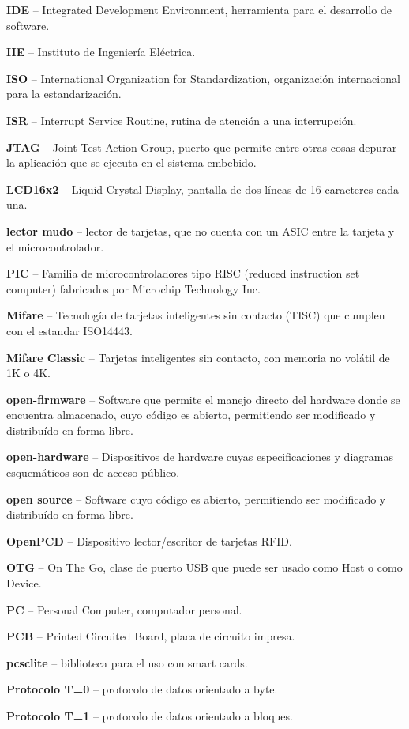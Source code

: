 \begin{glosario}
{\bf{IDE}} – Integrated Development Environment, herramienta para el desarrollo de software.

{\bf{IIE}} – Instituto de Ingeniería Eléctrica.

{\bf{ISO}} – International Organization for Standardization, organización internacional para la estandarización.

{\bf{ISR}} – Interrupt Service Routine, rutina de atención a una interrupción.

{\bf{JTAG}} – Joint Test Action Group, puerto que permite entre otras cosas depurar la aplicación que se ejecuta en el sistema embebido.

{\bf{LCD16x2}} – Liquid Crystal Display, pantalla de dos líneas de 16 caracteres cada una.

{\bf{lector mudo}} – lector de tarjetas, que no cuenta con un ASIC entre la tarjeta y el microcontrolador.

{\bf{PIC}} – Familia de microcontroladores tipo RISC (reduced instruction set computer) fabricados por Microchip Technology Inc.

{\bf{Mifare}} – Tecnología de tarjetas inteligentes sin contacto (TISC) que cumplen con el estandar ISO14443.

{\bf{Mifare Classic}} – Tarjetas inteligentes sin contacto, con memoria no volátil de 1K o 4K.

{\bf{open-firmware}} – Software que permite el manejo directo del hardware donde se encuentra almacenado, cuyo código es abierto, permitiendo ser modificado y distribuído en forma libre.

{\bf{open-hardware}} – Dispositivos de hardware cuyas especificaciones y diagramas esquemáticos son de acceso público.

{\bf{open source}} – Software cuyo código es abierto, permitiendo ser modificado y distribuído en forma libre.

{\bf{OpenPCD}} – Dispositivo lector/escritor de tarjetas RFID.

{\bf{OTG}} – On The Go, clase de puerto USB que puede ser usado como Host o como Device.

{\bf{PC}} – Personal Computer, computador personal.

{\bf{PCB}} – Printed Circuited Board, placa de circuito impresa.

{\bf{pcsclite}} – biblioteca para el uso con smart cards.

{\bf{Protocolo T=0}} – protocolo de datos orientado a byte.

{\bf{Protocolo T=1}} – protocolo de datos orientado a bloques.


\end{glosario}
